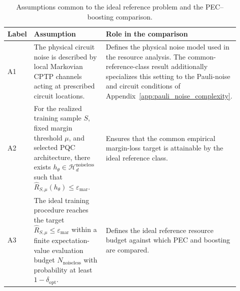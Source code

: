 \begin{table}[!htbp]
\centering
\small
\renewcommand{\arraystretch}{1.2}
\begin{tabular}{p{0.10\linewidth} p{0.48\linewidth} p{0.34\linewidth}}
\hline
\textbf{Label} &
\textbf{Assumption} &
\textbf{Role in the comparison}
\\
\hline

A1 &
The physical circuit noise is described by local Markovian CPTP channels
acting at prescribed circuit locations. &
Defines the physical noise model used in the resource analysis. The
common-reference-class result additionally specializes this setting to the
Pauli-noise and circuit conditions of
Appendix~\ref{app:pauli_noise_complexity}.
\\

A2 &
For the realized training sample $S$, fixed margin threshold $\mu$, and
selected PQC architecture, there exists
$h_\theta\in\mathcal H_d^{\mathrm{noiseless}}$
such that
$\widehat R_{S,\mu}(h_\theta)\leq\varepsilon_{\mathrm{mar}}$. &
Ensures that the common empirical margin-loss target is attainable by the
ideal reference class.
\\

A3 &
The ideal training procedure reaches the target
$\widehat R_{S,\mu}\leq\varepsilon_{\mathrm{mar}}$
within a finite expectation-value evaluation budget
$N_{\mathrm{noiseless}}$
with probability at least $1-\delta_{\mathrm{opt}}$. &
Defines the ideal reference resource budget against which PEC and boosting
are compared.
\\

\hline
\end{tabular}
\caption{Assumptions common to the ideal reference problem and the
PEC--boosting comparison.}
\label{tab:common_assumptions}
\end{table}
